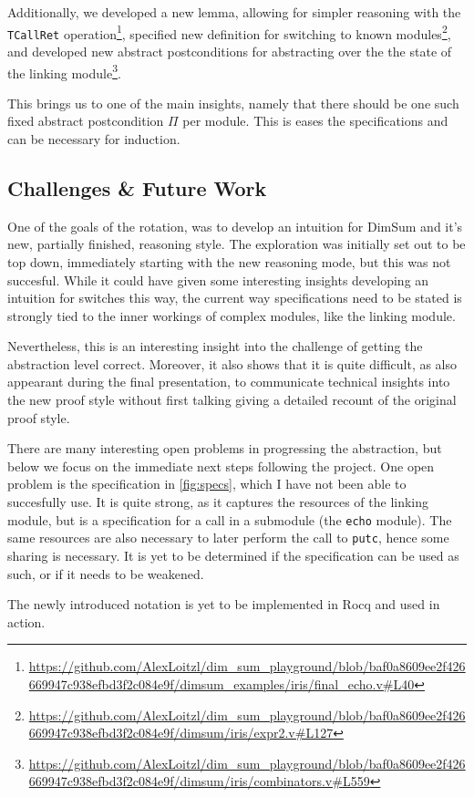 \documentclass[runningheads, orivec]{llncs}
\begin{document}
Additionally, we developed a new lemma, allowing for simpler reasoning with the \texttt{TCallRet} operation\footnote{\url{https://github.com/AlexLoitzl/dim_sum_playground/blob/baf0a8609ee2f426669947c938efbd3f2c084e9f/dimsum_examples/iris/final_echo.v\#L40}}, specified new definition for switching to known modules\footnote{\url{https://github.com/AlexLoitzl/dim_sum_playground/blob/baf0a8609ee2f426669947c938efbd3f2c084e9f/dimsum/iris/expr2.v\#L127}}, and developed new abstract postconditions for abstracting over the the state of the linking module\footnote{\url{https://github.com/AlexLoitzl/dim_sum_playground/blob/baf0a8609ee2f426669947c938efbd3f2c084e9f/dimsum/iris/combinators.v\#L559}}.

This brings us to one of the main insights, namely that there should be one such fixed abstract postcondition $\Pi$ per module. This is eases the specifications and can be necessary for induction.

\subsection{Challenges \& Future Work}

One of the goals of the rotation, was to develop an intuition for DimSum and it's new, partially finished, reasoning style. The exploration was initially set out to be top down, immediately starting with the new reasoning mode, but this was not succesful. While it could have given some interesting insights developing an intuition for switches this way, the current way specifications need to be stated is strongly tied to the inner workings of complex modules, like the linking module.

Nevertheless, this is an interesting insight into the challenge of getting the abstraction level correct. Moreover, it also shows that it is quite difficult, as also appearant during the final presentation, to communicate technical insights into the new proof style without first talking giving a detailed recount of the original proof style.

There are many interesting open problems in progressing the abstraction, but below we focus on the immediate next steps following the project. One open problem is the specification in \cref{fig:specs}, which I have not been able to succesfully use.
It is quite strong, as it captures the resources of the linking module, but is a specification for a call in a submodule (the \texttt{echo} module). The same resources are also necessary to later perform the call to \texttt{putc}, hence some sharing is necessary. It is yet to be determined if the specification can be used as such, or if it needs to be weakened.

The newly introduced notation is yet to be implemented in Rocq and used in action.




\end{document}
